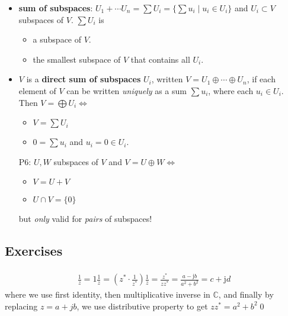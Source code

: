 \documentclass[11pt,notitlepage,oneside]{article}
\newcommand{\exo}[1]{%
\addtocontents{toc}{\protect\setcounter{tocdepth}{2}}%
\paragraph{#1}}
\begin{document}
\begin{itemize}
\item \textbf{sum of subspaces}: $U_1+\cdots U_n = \sum U_i =\{\sum u_i\mid u_i\in U_i\}$ and $U_i\subset V$ subspaces of $V$. $\sum U_i$ is
\begin{itemize}
\item a subspace of $V$.
\item the smallest subspace of $V$ that contains all $U_i$.
\end{itemize}

\item $V$ is a \textbf{direct sum of subspaces} $U_i$, written $V=U_1\oplus\cdots\oplus U_n$, if each element of $V$ can be written \emph{uniquely} as a sum $\sum u_i$, where each $u_i\in U_i$. 
Then $V=\bigoplus U_i \iff$
\begin{itemize}
\item $V = \sum U_i$
\item $0=\sum u_i$ and $u_i=0 \in U_i$.
\end{itemize}

\item[P6:\label{it:P1_6}] $U,W$ subspaces of $V$ and $V=U\oplus W \iff$
\begin{itemize}
\item $V=U+V$
\item $U\cap V=\{0\}$
\end{itemize}
but \emph{only} valid for \emph{pairs} of subspaces!

\end{itemize}

\subsection*{Exercises}
\exo{}
\begin{align*}
\frac{1}{z} = 1 \frac{1}{z} = (z^* \cdot \frac{1}{z^*}) \frac{1}{z} = \frac{z^*}{zz^*}=\frac{a-\mathrm{j}b}{a^2 + b^2} = c+\mathrm{j}d
\end{align*}
where we use first identity, then multiplicative inverse in $\mathbb{C}$, and finally by replacing $z=a+jb$, we use distributive property 
to get $zz^* = a^2 + b^2 $\qed
\end{document}
